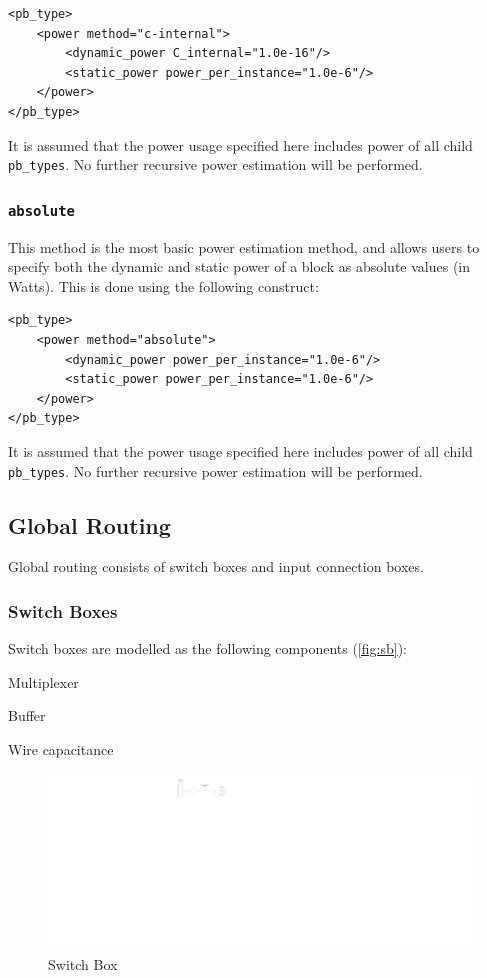 \documentclass[letterpaper,twoside,10pt]{article}
\begin{document}
\begin{BVerbatim}[bgcolor=LightGray, boxwidth=\textwidth] 
<pb_type>
	<power method="c-internal">
		<dynamic_power C_internal="1.0e-16"/>
		<static_power power_per_instance="1.0e-6"/>
	</power>
</pb_type>
\end{BVerbatim}

It is assumed that the power usage specified here includes power of all child \texttt{pb_types}.  No further recursive power estimation will be performed.

\subsubsection{\texttt{absolute}}
This method is the most basic power estimation method, and allows users to specify both the dynamic and static power of a block as absolute values (in Watts).  This is done using the following construct:

\begin{BVerbatim}[bgcolor=LightGray, boxwidth=\textwidth] 
<pb_type>
	<power method="absolute">
		<dynamic_power power_per_instance="1.0e-6"/>
		<static_power power_per_instance="1.0e-6"/>
	</power>
</pb_type>
\end{BVerbatim}

It is assumed that the power usage specified here includes power of all child \texttt{pb_types}.  No further recursive power estimation will be performed.

\subsection{Global Routing}	
Global routing consists of switch boxes and input connection boxes.

\subsubsection{Switch Boxes} \label{sec:sb}
Switch boxes are modelled as the following components (\autoref{fig:sb}):
\vspace{-10pt}
\begin{enumerate*}
	\item Multiplexer 
	\item Buffer
	\item Wire capacitance
\end{enumerate*}


\begin{figure}[ht]
	\centering
		\includegraphics[scale=0.7]{images/sb.pdf}
	\caption{Switch Box}
	\label{fig:sb}
\end{figure}
\end{document}
